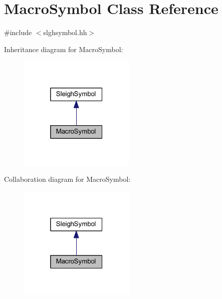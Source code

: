 \hypertarget{class_macro_symbol}{}\section{Macro\+Symbol Class Reference}
\label{class_macro_symbol}


{\ttfamily \#include $<$slghsymbol.\+hh$>$}



Inheritance diagram for Macro\+Symbol\+:
\nopagebreak
\begin{figure}[H]
\begin{center}
\leavevmode
\includegraphics[width=157pt]{class_macro_symbol__inherit__graph}
\end{center}
\end{figure}


Collaboration diagram for Macro\+Symbol\+:
\nopagebreak
\begin{figure}[H]
\begin{center}
\leavevmode
\includegraphics[width=157pt]{class_macro_symbol__coll__graph}
\end{center}
\end{figure}
